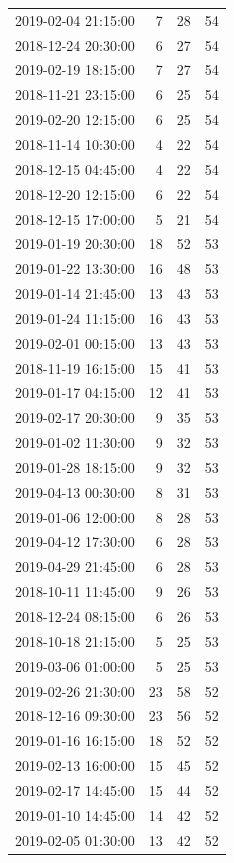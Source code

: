 \begin{tabular}{lrrr}
2019-02-04 21:15:00 & 7 & 28 & 54 \\
2018-12-24 20:30:00 & 6 & 27 & 54 \\
2019-02-19 18:15:00 & 7 & 27 & 54 \\
2018-11-21 23:15:00 & 6 & 25 & 54 \\
2019-02-20 12:15:00 & 6 & 25 & 54 \\
2018-11-14 10:30:00 & 4 & 22 & 54 \\
2018-12-15 04:45:00 & 4 & 22 & 54 \\
2018-12-20 12:15:00 & 6 & 22 & 54 \\
2018-12-15 17:00:00 & 5 & 21 & 54 \\
2019-01-19 20:30:00 & 18 & 52 & 53 \\
2019-01-22 13:30:00 & 16 & 48 & 53 \\
2019-01-14 21:45:00 & 13 & 43 & 53 \\
2019-01-24 11:15:00 & 16 & 43 & 53 \\
2019-02-01 00:15:00 & 13 & 43 & 53 \\
2018-11-19 16:15:00 & 15 & 41 & 53 \\
2019-01-17 04:15:00 & 12 & 41 & 53 \\
2019-02-17 20:30:00 & 9 & 35 & 53 \\
2019-01-02 11:30:00 & 9 & 32 & 53 \\
2019-01-28 18:15:00 & 9 & 32 & 53 \\
2019-04-13 00:30:00 & 8 & 31 & 53 \\
2019-01-06 12:00:00 & 8 & 28 & 53 \\
2019-04-12 17:30:00 & 6 & 28 & 53 \\
2019-04-29 21:45:00 & 6 & 28 & 53 \\
2018-10-11 11:45:00 & 9 & 26 & 53 \\
2018-12-24 08:15:00 & 6 & 26 & 53 \\
2018-10-18 21:15:00 & 5 & 25 & 53 \\
2019-03-06 01:00:00 & 5 & 25 & 53 \\
2019-02-26 21:30:00 & 23 & 58 & 52 \\
2018-12-16 09:30:00 & 23 & 56 & 52 \\
2019-01-16 16:15:00 & 18 & 52 & 52 \\
2019-02-13 16:00:00 & 15 & 45 & 52 \\
2019-02-17 14:45:00 & 15 & 44 & 52 \\
2019-01-10 14:45:00 & 14 & 42 & 52 \\
2019-02-05 01:30:00 & 13 & 42 & 52 \\

\end{tabular}

